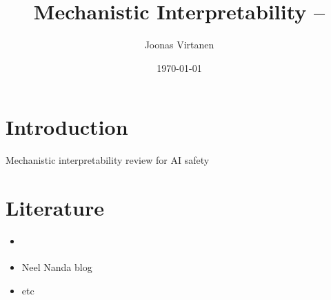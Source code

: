 \documentclass[12pt, a4paper]{article}
\title{Mechanistic Interpretability -- }
\author{Joonas Virtanen}
\date{\today}
\begin{document}
\maketitle

\section{Introduction}
Mechanistic interpretability review for AI safety \cite{bereska2024}


\section*{Literature}
\begin{itemize}
    \item \cite{bereska2024}
    \item Neel Nanda blog
    \item etc
\end{itemize}

\printbibliography
\end{document}
